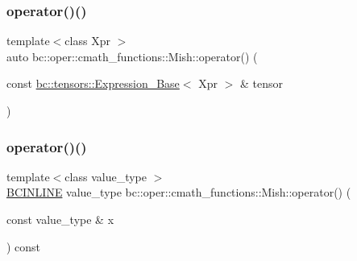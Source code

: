 \mbox{\label{structbc_1_1oper_1_1cmath__functions_1_1Mish_ac6f8dae1eec1b5292eb14d4032a59f80}} 
\subsubsection{\texorpdfstring{operator()()}{operator()()}\hspace{0.1cm}{\footnotesize\ttfamily [2/3]}}
{\footnotesize\ttfamily template$<$class Xpr $>$ \\
auto bc\+::oper\+::cmath\+\_\+functions\+::\+Mish\+::operator() (\begin{DoxyParamCaption}\item[{const \hyperlink{classbc_1_1tensors_1_1Expression__Base}{bc\+::tensors\+::\+Expression\+\_\+\+Base}$<$ Xpr $>$ \&}]{tensor }\end{DoxyParamCaption})\hspace{0.3cm}{\ttfamily [inline]}}

\mbox{\label{structbc_1_1oper_1_1cmath__functions_1_1Mish_a13d5c78140216f39a548413fd6bc2705}} 
\subsubsection{\texorpdfstring{operator()()}{operator()()}\hspace{0.1cm}{\footnotesize\ttfamily [3/3]}}
{\footnotesize\ttfamily template$<$class value\+\_\+type $>$ \\
\hyperlink{common_8h_a6699e8b0449da5c0fafb878e59c1d4b1}{B\+C\+I\+N\+L\+I\+NE} value\+\_\+type bc\+::oper\+::cmath\+\_\+functions\+::\+Mish\+::operator() (\begin{DoxyParamCaption}\item[{const value\+\_\+type \&}]{x }\end{DoxyParamCaption}) const\hspace{0.3cm}{\ttfamily [inline]}}



